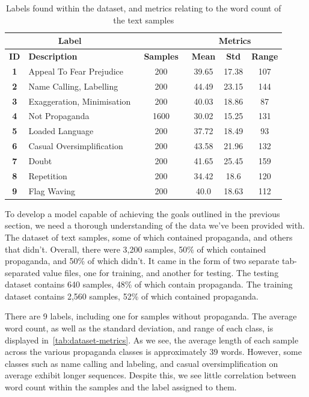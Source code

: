 \documentclass[twocolumn]{article}
\begin{document}
\begin{table}[t!]
    \centering
    \begin{tabular}{@{}clccc@{}c}
        \toprule
        \multicolumn{2}{c}{\textbf{Label}} &  & \multicolumn{3}{c}{\textbf{Metrics}} \\ \midrule
        \textbf{ID}& \textbf{Description} & \textbf{~Samples~} & \textbf{Mean} & \textbf{Std} & \textbf{Range} \\ \bottomrule
        \textbf{1} & Appeal To Fear Prejudice & 200 & 39.65 & 17.38 & 107 \\
        \textbf{2} & Name Calling, Labelling & 200 & 44.49 & 23.15 & 144 \\
        \textbf{3} & Exaggeration, Minimisation & 200 & 40.03 & 18.86 & 87 \\
        \textbf{4} & Not Propaganda & 1600 & 30.02 & 15.25 & 131 \\
        \textbf{5} & Loaded Language & 200 & 37.72 & 18.49 & 93 \\
        \textbf{6} & Casual Oversimplification & 200 & 43.58 & 21.96 & 132 \\
        \textbf{7} & Doubt & 200 & 41.65 & 25.45 & 159 \\
        \textbf{8} & Repetition & 200 & 34.42 & 18.6 & 120 \\
        \textbf{9} & Flag Waving & 200 & 40.0 & 18.63 & 112 \\ 
        \bottomrule
    \end{tabular}
    \caption{Labels found within the dataset, and metrics relating to the word count of the text samples}
    \label{tab:dataset-metrics}
\end{table}

To develop a model capable of achieving the goals outlined in the previous section, we need a thorough understanding of the data we've been provided with. The dataset of text samples, some of which contained propaganda, and others that didn't. Overall, there were 3,200 samples, 50\% of which contained propaganda, and 50\% of which didn't. It came in the form of two separate tab-separated value files, one for training, and another for testing. The testing dataset contains 640 samples, 48\% of which contain propaganda. The training dataset contains 2,560 samples, 52\% of which contained propaganda. 

There are 9 labels, including one for samples without propaganda. The average word count, as well as the standard deviation, and range of each class, is displayed in~\autoref{tab:dataset-metrics}. As we see, the average length of each sample across the various propaganda classes is approximately 39 words. However, some classes such as name calling and labeling, and casual oversimplification on average exhibit longer sequences. Despite this, we see little correlation between word count within the samples and the label assigned to them. 
\end{document}
